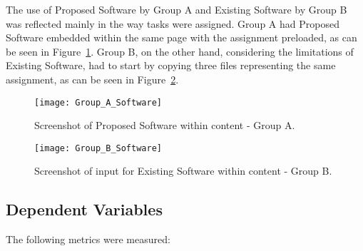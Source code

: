 The use of Proposed Software by Group A and Existing Software by Group B was reflected mainly in the way tasks were assigned.
Group A had Proposed Software embedded within the same page with the assignment preloaded, as can be seen in Figure~\ref{fig:group-a-software}.
Group B, on the other hand, considering the limitations of Existing Software, had to start by copying three files representing the same assignment, as can be seen in Figure~\ref{fig:group-b-software}.

\begin{figure}[ht]
    \centering
    \texttt{[image: Group\_A\_Software]}
    \caption{Screenshot of Proposed Software within content - Group A.}
    \label{fig:group-a-software}
\end{figure}

\begin{figure}[ht]
    \centering
    \texttt{[image: Group\_B\_Software]}
    \caption{Screenshot of input for Existing Software within content - Group B.}
    \label{fig:group-b-software}
\end{figure}

\subsection{Dependent Variables}

The following metrics were measured:

